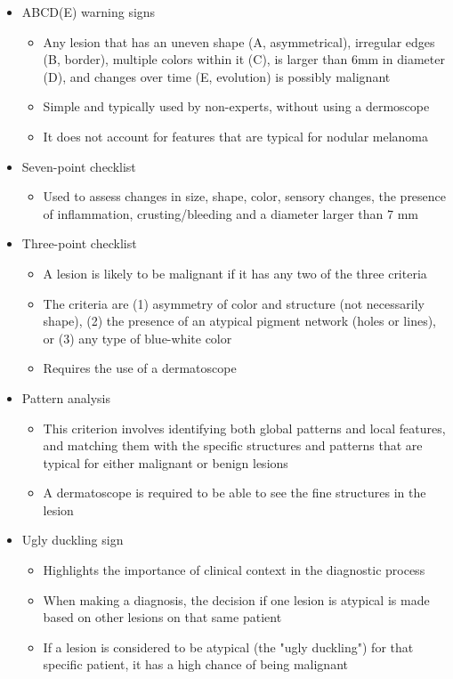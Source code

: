 \begin{itemize}
    \item ABCD(E) warning signs \cite{abcde}
    \begin{itemize}
        \item Any lesion that has an uneven shape (A, asymmetrical), irregular edges (B, border), multiple colors within it (C), is larger than 6mm in diameter (D), and changes over time (E, evolution) is possibly malignant
        \item Simple and typically used by non-experts, without using a dermoscope
        \item It does not account for features that are typical for nodular melanoma
    \end{itemize}
    \item Seven-point checklist \cite{seven_point}
    \begin{itemize}
        \item Used to assess changes in size, shape, color, sensory changes, the presence of inflammation, crusting/bleeding and a diameter larger than 7 mm
    \end{itemize}
    \item Three-point checklist \cite{three_point}
    \begin{itemize}
        \item A lesion is likely to be malignant if it has any two of the three criteria
        \item The criteria are (1) asymmetry of color and structure (not necessarily shape), (2) the presence of an atypical pigment network (holes or lines), or (3) any type of blue-white color
        \item Requires the use of a dermatoscope
    \end{itemize}
    \item Pattern analysis \cite{pattern_analysis}
    \begin{itemize}
        \item This criterion involves identifying both global patterns and local features, and matching them with the specific structures and patterns that are typical for either malignant or benign lesions
        \item A dermatoscope is required to be able to see the fine structures in the lesion
    \end{itemize}
    \item Ugly duckling sign \cite{ugly_duckling, isic_2020_dataset}
    \begin{itemize}
        \item Highlights the importance of clinical context in the diagnostic process
        \item When making a diagnosis, the decision if one lesion is atypical is made based on other lesions on that same patient
        \item If a lesion is considered to be atypical (the "ugly duckling") for that specific patient, it has a high chance of being malignant
    \end{itemize}  
\end{itemize}

